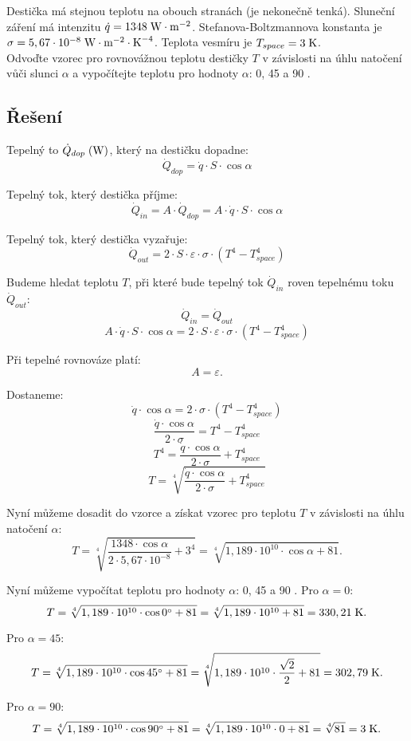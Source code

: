 \documentclass{article}
\begin{document}
Destička má stejnou teplotu na obouch stranách (je nekonečně tenká). Sluneční záření má intenzitu $\dot{q} = 1348 \; \textrm{W} \cdot \textrm{m}^{-2}$. Stefanova-Boltzmannova konstanta je $\sigma = 5,67 \cdot 10^{-8} \; \textrm{W} \cdot \textrm{m}^{-2} \cdot \textrm{K}^{-4}$. Teplota vesmíru je $T_{space} = 3 \; \textrm{K}$.\\

Odvoďte vzorec pro rovnovážnou teplotu destičky $T$ v závislosti na úhlu natočení vůči slunci $\alpha$ a vypočítejte teplotu pro hodnoty $\alpha$: 0, 45 a 90 \ueqDEGREE.



\subsection{Řešení}
Tepelný to $\dot{Q}_{dop} \; (\textrm{W})$, který na destičku dopadne:
$$
    \dot{Q}_{dop} = \dot{q} \cdot S \cdot \cos \alpha
$$

Tepelný tok, který destička příjme:
$$
    \dot{Q}_{in} = A \cdot \dot{Q}_{dop} = A \cdot \dot{q} \cdot S \cdot \cos \alpha
$$

Tepelný tok, který destička vyzařuje:
$$
    \dot{Q}_{out} = 2 \cdot S \cdot \varepsilon \cdot \sigma \cdot \left( T^4 - T_{space}^4 \right)
$$

Budeme hledat teplotu $T$, při které bude tepelný tok $\dot{Q}_{in}$ roven tepelnému toku $\dot{Q}_{out}$:
$$
    \dot{Q}_{in} = \dot{Q}_{out}
$$
$$
    A \cdot \dot{q} \cdot S \cdot \cos \alpha = 2 \cdot S \cdot \varepsilon \cdot \sigma \cdot \left( T^4 - T_{space}^4 \right)
$$

Při tepelné rovnováze platí:
$$
    A = \varepsilon.
$$

Dostaneme:
$$
    \dot{q} \cdot \cos \alpha = 2 \cdot \sigma \cdot \left( T^4 - T_{space}^4 \right)
$$
$$
    \frac{\dot{q} \cdot \cos \alpha}{2 \cdot \sigma} = T^4 - T_{space}^4
$$
$$
    T^4 = \frac{\dot{q} \cdot \cos \alpha}{2 \cdot \sigma} + T_{space}^4
$$
$$
    T = \sqrt[4]{\frac{\dot{q} \cdot \cos \alpha}{2 \cdot \sigma} + T_{space}^4}
$$

Nyní můžeme dosadit do vzorce a získat vzorec pro teplotu $T$ v závislosti na úhlu natočení $\alpha$:
$$
    T = \sqrt[4]{\frac{1348 \cdot \cos \alpha}{2 \cdot 5,67 \cdot 10^{-8}} + 3^4} = \sqrt[4]{1,189 \cdot 10^{10} \cdot \cos \alpha + 81}.
$$

Nyní můžeme vypočítat teplotu pro hodnoty $\alpha$: 0, 45 a 90 \ueqDEGREE. Pro $\alpha = 0$:
$$
    T = \sqrt[4]{1,189 \cdot 10^{10} \cdot \cos 0 ^\circ + 81} = \sqrt[4]{1,189 \cdot 10^{10} + 81} = 330,21 \; \textrm{K}.
$$

Pro $\alpha = 45$:
$$
    T = \sqrt[4]{1,189 \cdot 10^{10} \cdot \cos 45 ^\circ + 81} = \sqrt[4]{1,189 \cdot 10^{10} \cdot \frac{\sqrt{2}}{2} + 81} = 302,79 \; \textrm{K}.
$$

Pro $\alpha = 90$:
$$
    T = \sqrt[4]{1,189 \cdot 10^{10} \cdot \cos 90 ^\circ + 81} = \sqrt[4]{1,189 \cdot 10^{10} \cdot 0 + 81} = \sqrt[4]{81} = 3 \; \textrm{K}.
$$
\end{document}
